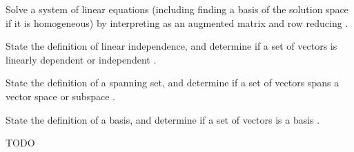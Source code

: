 \documentclass{article}
\begin{document}
\begin{readinessAssuranceOutcomes}
\item Solve a system of linear equations (including finding a basis of the solution space if it is homogeneous) by interpreting as an augmented matrix and row reducing .
\item State the definition of linear independence, and determine if a set of vectors is linearly dependent or independent .
\item State the definition of a spanning set, and determine if a set of vectors spans a vector space or subspace .
\item State the definition of a basis, and determine if a set of vectors is a basis .
\end{readinessAssuranceOutcomes}

\begin{readinessAssuranceResources}
\item TODO
\end{readinessAssuranceResources}
\end{document}
